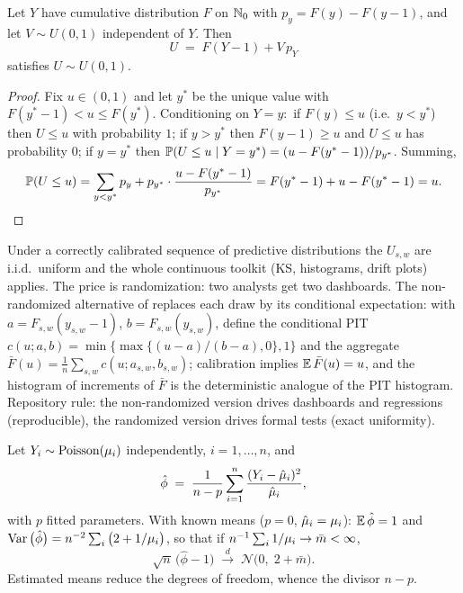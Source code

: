 \begin{proposition}\label{prop:ch07:rpit}
Let $Y$ have cumulative distribution $F$ on $\mathbb{N}_0$ with
$p_y=F(y)-F(y-1)$, and let $V\sim U(0,1)$ independent of $Y$. Then
\begin{equation}\label{eq:ch07:rpit}
U \;=\; F(Y-1) + V\,p_Y
\end{equation}
satisfies $U \sim U(0,1)$.
\end{proposition}

\begin{proof}
Fix $u\in(0,1)$ and let $y^{*}$ be the unique value with
$F(y^{*}-1) < u \le F(y^{*})$. Conditioning on $Y=y$:\ if $F(y)\le
u$ (i.e.\ $y<y^{*}$) then $U\le u$ with probability $1$; if $y>y^{*}$
then $F(y-1)\ge u$ and $U\le u$ has probability $0$; if $y=y^{*}$ then
$\mathbb{P}(U\le u \mid Y=y^{*}) = (u - F(y^{*}-1))/p_{y^{*}}$. Summing,
\[
\mathbb{P}(U\le u)
 = \sum_{y<y^{*}} p_y + p_{y^{*}}\cdot\frac{u-F(y^{*}-1)}{p_{y^{*}}}
 = F(y^{*}-1) + u - F(y^{*}-1) = u. \qedhere
\]
\end{proof}

Under a correctly calibrated sequence of predictive distributions the
$U_{s,w}$ are i.i.d.\ uniform and the whole continuous toolkit (KS,
histograms, drift plots) applies. The price is randomization: two
analysts get two dashboards. The non-randomized alternative of
\citet{czado2009} replaces each draw by its conditional expectation: with
$a=F_{s,w}(y_{s,w}-1)$, $b=F_{s,w}(y_{s,w})$, define the conditional PIT
$c(u;a,b) = \min\{\max\{(u-a)/(b-a),0\},1\}$ and the aggregate
$\bar F(u) = \frac{1}{n}\sum_{s,w} c(u;a_{s,w},b_{s,w})$; calibration
implies $\mathbb{E}\,\bar F(u)=u$, and the histogram of increments of $\bar F$ is
the deterministic analogue of the PIT histogram. Repository rule: the
non-randomized version drives dashboards and regressions (reproducible),
the randomized version drives formal tests (exact uniformity).

\begin{proposition}\label{prop:ch07:dispersion}
Let $Y_i \sim \mathrm{Poisson}(\mu_i)$ independently, $i=1,\dots,n$, and
\begin{equation}\label{eq:ch07:dispersion}
\hat\phi \;=\; \frac{1}{n-p}\sum_{i=1}^{n}
 \frac{(Y_i-\hat{\mu}_i)^2}{\hat{\mu}_i},
\end{equation}
with $p$ fitted parameters. With known means ($p=0$, $\hat{\mu}_i=\mu_i$):
$\mathbb{E}\,\hat\phi = 1$ and
$\operatorname{Var}\big(\hat\phi\big) = n^{-2}\sum_i \big(2 + 1/\mu_i\big)$, so that if
$n^{-1}\sum_i 1/\mu_i \to \bar m < \infty$,
\[
\sqrt{n}\,\big(\hat\phi - 1\big) \;\xrightarrow{d}\;
\mathcal{N}\!\big(0,\; 2 + \bar m\big).
\]
Estimated means reduce the degrees of freedom, whence the divisor $n-p$.
\end{proposition}

